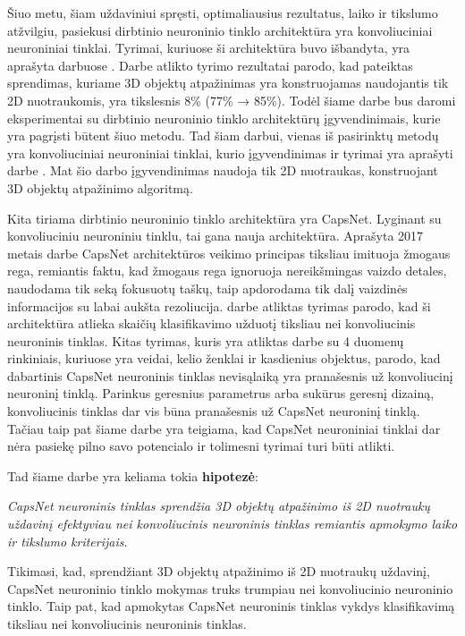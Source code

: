 Šiuo metu, šiam uždaviniui spręsti, optimaliausius  rezultatus, laiko ir tikslumo atžvilgiu, pasiekusi dirbtinio neuroninio tinklo architektūra yra konvoliuciniai neuroniniai tinklai. Tyrimai, kuriuose ši architektūra buvo išbandyta, yra aprašyta darbuose \cite{cnnExp1, cnnExp2}. Darbe \cite{dbnExp} atlikto tyrimo rezultatai parodo, kad pateiktas sprendimas, kuriame 3D objektų atpažinimas yra konstruojamas naudojantis tik 2D nuotraukomis, yra tikslesnis 8\% (77\% → 85\%). Todėl šiame darbe bus daromi eksperimentai su dirbtinio neuroninio tinklo architektūrų įgyvendinimais, kurie yra pagrįsti būtent šiuo metodu. Tad šiam darbui, vienas iš pasirinktų metodų yra konvoliuciniai neuroniniai tinklai, kurio įgyvendinimas ir tyrimai yra aprašyti darbe \cite{cnnExp1}. Mat šio darbo įgyvendinimas naudoja tik 2D nuotraukas, konstruojant 3D objektų atpažinimo algoritmą.

Kita tiriama dirbtinio neuroninio tinklo architektūra yra CapsNet. Lyginant su konvoliuciniu neuroniniu tinklu, tai gana nauja architektūra. Aprašyta 2017 metais darbe \cite{capsNet} CapsNet architektūros veikimo principas tiksliau imituoja žmogaus rega, remiantis faktu, kad žmogaus rega ignoruoja nereikšmingas vaizdo detales, naudodama tik seką fokusuotų taškų, taip apdorodama tik dalį vaizdinės informacijos su labai aukšta rezoliucija. \cite{capsNet} darbe atliktas tyrimas parodo, kad ši architektūra atlieka skaičių klasifikavimo užduotį tiksliau nei konvoliucinis neuroninis tinklas. Kitas tyrimas, kuris yra atliktas darbe \cite{capsCNN} su 4 duomenų rinkiniais, kuriuose yra veidai, kelio ženklai ir kasdienius objektus, parodo, kad dabartinis CapsNet neuroninis tinklas nevisąlaiką yra pranašesnis už konvoliucinį neuroninį tinklą. Parinkus geresnius parametrus arba sukūrus geresnį dizainą, konvoliucinis tinklas dar vis būna pranašesnis už CapsNet neuroninį tinklą. Tačiau taip pat šiame darbe yra teigiama, kad CapsNet neuroniniai tinklai dar nėra pasiekę pilno savo potencialo ir tolimesni tyrimai turi būti atlikti.

Tad šiame darbe yra keliama tokia \textbf{hipotezė}:

\textit{CapsNet neuroninis tinklas sprendžia 3D objektų atpažinimo iš 2D nuotraukų uždavinį efektyviau nei konvoliucinis neuroninis tinklas remiantis apmokymo laiko ir tikslumo kriterijais}.

Tikimasi, kad, sprendžiant 3D objektų atpažinimo iš 2D nuotraukų uždavinį, CapsNet neuroninio tinklo mokymas truks trumpiau nei konvoliucinio neuroninio tinklo. Taip pat, kad apmokytas CapsNet neuroninis tinklas vykdys klasifikavimą tiksliau nei konvoliucinis neuroninis tinklas.


